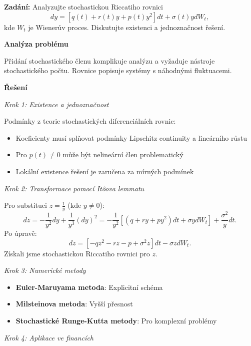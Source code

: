 \begin{example}
\label{ex:e2-nahodne-koeficienty}

\noindent\textbf{Zadání:} Analyzujte stochastickou Riccatiho rovnici
\[
dy = [q(t) + r(t)y + p(t)y^2]dt + \sigma(t)y dW_t,
\]
kde $W_t$ je Wienerův proces. Diskutujte existenci a jednoznačnost řešení.

\vspace{1.5\baselineskip}

\noindent\textbf{Analýza problému}

\noindent Přidání stochastického členu komplikuje analýzu a vyžaduje nástroje stochastického počtu. Rovnice popisuje systémy s náhodnými fluktuacemi.

\vspace{1.5\baselineskip}

\noindent\textbf{Řešení}

\noindent\textit{Krok 1: Existence a jednoznačnost}

Podmínky z teorie stochastických diferenciálních rovnic:
\begin{itemize}
\item Koeficienty musí splňovat podmínky Lipschitz continuity a lineárního růstu
\item Pro $p(t) \neq 0$ může být nelineární člen problematický
\item Lokální existence řešení je zaručena za mírných podmínek
\end{itemize}

\noindent\textit{Krok 2: Transformace pomocí Itôova lemmatu}

Pro substituci $z = \frac{1}{y}$ (kde $y \neq 0$):
\[
dz = -\frac{1}{y^2}dy + \frac{1}{y^3}(dy)^2 = -\frac{1}{y^2}[(q + ry + py^2)dt + \sigma y dW_t] + \frac{\sigma^2}{y}dt.
\]
Po úpravě:
\[
dz = [-q z^2 - r z - p + \sigma^2 z]dt - \sigma z dW_t.
\]
Získali jsme stochastickou Riccatiho rovnici pro $z$.

\noindent\textit{Krok 3: Numerické metody}

\begin{itemize}
\item \textbf{Euler-Maruyama metoda}: Explicitní schéma
\item \textbf{Milsteinova metoda}: Vyšší přesnost
\item \textbf{Stochastické Runge-Kutta metody}: Pro komplexní problémy
\end{itemize}

\noindent\textit{Krok 4: Aplikace ve financích}


\end{example}
